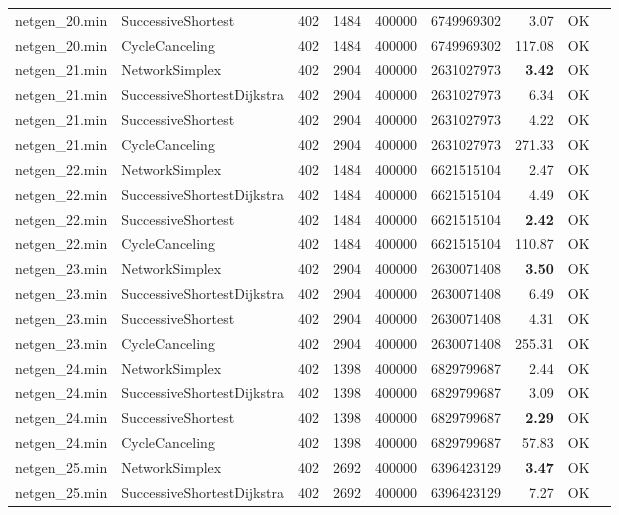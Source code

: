 \begin{longtable}{llrrrrrrl}
netgen\_20.min & SuccessiveShortest & 402 & 1484 & 400000 & 6749969302 & 3.07 & OK \\
netgen\_20.min & CycleCanceling & 402 & 1484 & 400000 & 6749969302 & 117.08 & OK \\
\midrule
netgen\_21.min & NetworkSimplex & 402 & 2904 & 400000 & 2631027973 & \textbf{3.42} & OK \\
netgen\_21.min & SuccessiveShortestDijkstra & 402 & 2904 & 400000 & 2631027973 & 6.34 & OK \\
netgen\_21.min & SuccessiveShortest & 402 & 2904 & 400000 & 2631027973 & 4.22 & OK \\
netgen\_21.min & CycleCanceling & 402 & 2904 & 400000 & 2631027973 & 271.33 & OK \\
\midrule
netgen\_22.min & NetworkSimplex & 402 & 1484 & 400000 & 6621515104 & 2.47 & OK \\
netgen\_22.min & SuccessiveShortestDijkstra & 402 & 1484 & 400000 & 6621515104 & 4.49 & OK \\
netgen\_22.min & SuccessiveShortest & 402 & 1484 & 400000 & 6621515104 & \textbf{2.42} & OK \\
netgen\_22.min & CycleCanceling & 402 & 1484 & 400000 & 6621515104 & 110.87 & OK \\
\midrule
netgen\_23.min & NetworkSimplex & 402 & 2904 & 400000 & 2630071408 & \textbf{3.50} & OK \\
netgen\_23.min & SuccessiveShortestDijkstra & 402 & 2904 & 400000 & 2630071408 & 6.49 & OK \\
netgen\_23.min & SuccessiveShortest & 402 & 2904 & 400000 & 2630071408 & 4.31 & OK \\
netgen\_23.min & CycleCanceling & 402 & 2904 & 400000 & 2630071408 & 255.31 & OK \\
\midrule
netgen\_24.min & NetworkSimplex & 402 & 1398 & 400000 & 6829799687 & 2.44 & OK \\
netgen\_24.min & SuccessiveShortestDijkstra & 402 & 1398 & 400000 & 6829799687 & 3.09 & OK \\
netgen\_24.min & SuccessiveShortest & 402 & 1398 & 400000 & 6829799687 & \textbf{2.29} & OK \\
netgen\_24.min & CycleCanceling & 402 & 1398 & 400000 & 6829799687 & 57.83 & OK \\
\midrule
netgen\_25.min & NetworkSimplex & 402 & 2692 & 400000 & 6396423129 & \textbf{3.47} & OK \\
netgen\_25.min & SuccessiveShortestDijkstra & 402 & 2692 & 400000 & 6396423129 & 7.27 & OK \\

\end{longtable}
